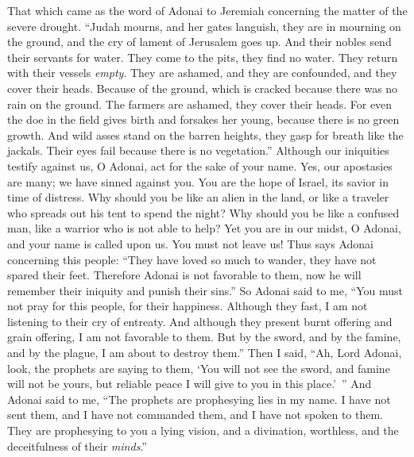 \begin{biblechapter} %
 That which came as the word of Adonai to Jeremiah concerning the matter of the severe drought.
\verse “Judah mourns, and her gates languish, 
they are in mourning on the ground, 
and the cry of lament of Jerusalem goes up.
\verse And their nobles send their servants for water. 
They come to the pits, they find no water. 
They return with their vessels \textit{empty}. 
They are ashamed, and they are confounded, 
and they cover their heads.
\verse Because of the ground, which is cracked 
because there was no rain on the ground. 
The farmers are ashamed, 
they cover their heads.
\verse For even the doe in the field gives birth and forsakes her young, 
because there is no green growth.
\verse And wild asses stand on the barren heights, 
they gasp for breath like the jackals. 
Their eyes fail 
because there is no vegetation.”
\verse Although our iniquities testify against us, O Adonai, 
act for the sake of your name. 
Yes, our apostasies are many; 
we have sinned against you.
\verse You are the hope of Israel, 
its savior in time of distress. 
Why should you be like an alien in the land, 
or like a traveler who spreads out his tent  to spend the night?
\verse Why should you be like a confused man, 
like a warrior who is not able to help? 
Yet you are in our midst, O Adonai, 
and your name is called upon us. 
You must not leave us!
\verse Thus says Adonai concerning this people: “They have loved so much to wander, 
they have not spared their feet. 
Therefore Adonai is not favorable to them, 
now he will remember their iniquity and punish their sins.”
 So Adonai said to me, “You must not pray for this people, for their happiness.
\verse Although they fast, I am not listening to their cry of entreaty. And although they present burnt offering and grain offering, I am not favorable to them. But by the sword, and by the famine, and by the plague, I am about to destroy them.”
\verse Then I said, “Ah, Lord Adonai, look, the prophets are saying to them, ‘You will not see the sword, and famine will not be yours, but reliable peace I will give to you in this place.’ ”
\verse And Adonai said to me, “The prophets are prophesying lies in my name. I have not sent them, and I have not commanded them, and I have not spoken to them. They are prophesying to you a lying vision, and a divination, worthless, and the deceitfulness of their \textit{minds}.”

\end{biblechapter}
